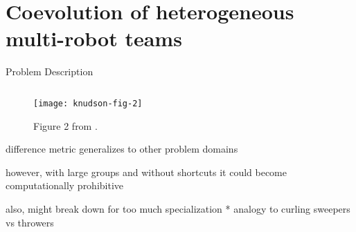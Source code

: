 \section{Coevolution of heterogeneous multi-robot teams \cite{knudson2010coevolution}}

\begin{frame}{Problem Description}

\begin{figure}

\begin{columns}
\begin{column}{0.7\textwidth}
\texttt{[image: knudson-fig-2]}
\end{column}
\begin{column}{0.3\textwidth}
\caption{
Figure 2 from \cite{knudson2010coevolution}.
}
\end{column}
\end{columns}
\end{figure}

\end{frame}

\begin{frame}

difference metric generalizes to other problem domains

however, with large groups and without shortcuts it could become computationally prohibitive

also, might break down for too much specialization
* analogy to curling sweepers vs throwers

\end{frame}
